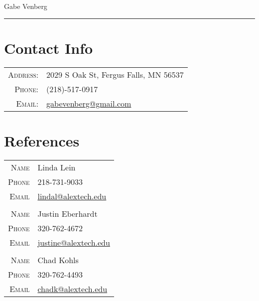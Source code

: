 \documentclass[letterpaper,12pt]{article}
\begin{document}
\pagestyle{empty}%

	\par{\centering
		{\huge Gabe Venberg
	}\bigskip\par}
\hrule

\section*{Contact Info}
	\begin{tabular}{rl}
	\textsc{Address:} & 2029 S Oak St, Fergus Falls, MN 56537\\
	\textsc{Phone:} & (218)-517-0917\\
	\textsc{Email:} & \href{mailto:gabevenberg@gmail.com}{gabevenberg@gmail.com}\\
	\end{tabular}

\section*{References}
	\begin{tabular}{r|p{11cm}}
	\textsc{Name} & Linda Lein\\
	\textsc{Phone} & 218-731-9033\\
	\textsc{Email} & \href{mailto:lindal@alextech.edu}{lindal@alextech.edu}\\
	\multicolumn{2}{c}{}\\
	\textsc{Name} & Justin Eberhardt\\
	\textsc{Phone} & 320-762-4672\\
	\textsc{Email} & \href{mailto:justine@alextech.edu}{justine@alextech.edu}\\
	\multicolumn{2}{c}{}\\
	\textsc{Name} & Chad Kohls\\
	\textsc{Phone} & 320-762-4493\\
	\textsc{Email} & \href{mailto:chadk@alextech.edu}{chadk@alextech.edu}\\
	\end{tabular}
\end{document}

